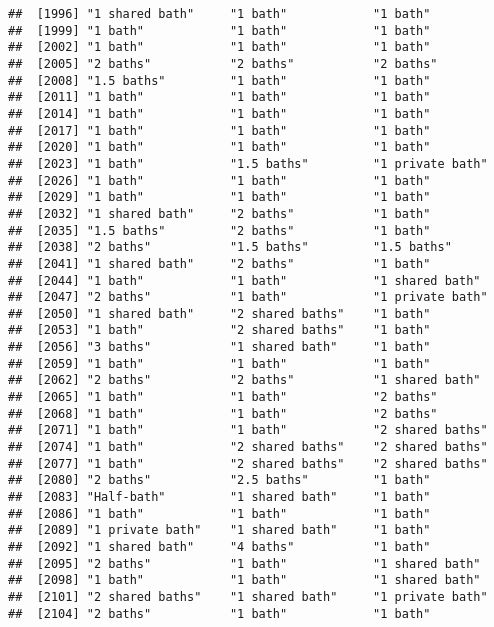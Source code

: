 \documentclass[
]{article}
\begin{document}
\begin{verbatim}
##  [1996] "1 shared bath"     "1 bath"            "1 bath"           
##  [1999] "1 bath"            "1 bath"            "1 bath"           
##  [2002] "1 bath"            "1 bath"            "1 bath"           
##  [2005] "2 baths"           "2 baths"           "2 baths"          
##  [2008] "1.5 baths"         "1 bath"            "1 bath"           
##  [2011] "1 bath"            "1 bath"            "1 bath"           
##  [2014] "1 bath"            "1 bath"            "1 bath"           
##  [2017] "1 bath"            "1 bath"            "1 bath"           
##  [2020] "1 bath"            "1 bath"            "1 bath"           
##  [2023] "1 bath"            "1.5 baths"         "1 private bath"   
##  [2026] "1 bath"            "1 bath"            "1 bath"           
##  [2029] "1 bath"            "1 bath"            "1 bath"           
##  [2032] "1 shared bath"     "2 baths"           "1 bath"           
##  [2035] "1.5 baths"         "2 baths"           "1 bath"           
##  [2038] "2 baths"           "1.5 baths"         "1.5 baths"        
##  [2041] "1 shared bath"     "2 baths"           "1 bath"           
##  [2044] "1 bath"            "1 bath"            "1 shared bath"    
##  [2047] "2 baths"           "1 bath"            "1 private bath"   
##  [2050] "1 shared bath"     "2 shared baths"    "1 bath"           
##  [2053] "1 bath"            "2 shared baths"    "1 bath"           
##  [2056] "3 baths"           "1 shared bath"     "1 bath"           
##  [2059] "1 bath"            "1 bath"            "1 bath"           
##  [2062] "2 baths"           "2 baths"           "1 shared bath"    
##  [2065] "1 bath"            "1 bath"            "2 baths"          
##  [2068] "1 bath"            "1 bath"            "2 baths"          
##  [2071] "1 bath"            "1 bath"            "2 shared baths"   
##  [2074] "1 bath"            "2 shared baths"    "2 shared baths"   
##  [2077] "1 bath"            "2 shared baths"    "2 shared baths"   
##  [2080] "2 baths"           "2.5 baths"         "1 bath"           
##  [2083] "Half-bath"         "1 shared bath"     "1 bath"           
##  [2086] "1 bath"            "1 bath"            "1 bath"           
##  [2089] "1 private bath"    "1 shared bath"     "1 bath"           
##  [2092] "1 shared bath"     "4 baths"           "1 bath"           
##  [2095] "2 baths"           "1 bath"            "1 shared bath"    
##  [2098] "1 bath"            "1 bath"            "1 shared bath"    
##  [2101] "2 shared baths"    "1 shared bath"     "1 private bath"   
##  [2104] "2 baths"           "1 bath"            "1 bath"           

\end{verbatim}
\end{document}
